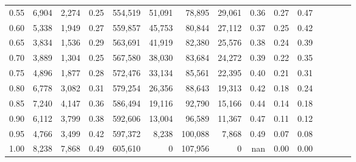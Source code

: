 \begin{tabular}{rrrcrrrrrrrrrrr}
0.55 &    6,904 &   2,274 &                                       0.25 &  554,519 &   51,091 &   78,895 &   29,061 &  0.36 &  0.27 &                         0.47 \\
0.60 &    5,338 &   1,949 &                                       0.27 &  559,857 &   45,753 &   80,844 &   27,112 &  0.37 &  0.25 &                         0.42 \\
0.65 &    3,834 &   1,536 &                                       0.29 &  563,691 &   41,919 &   82,380 &   25,576 &  0.38 &  0.24 &                         0.39 \\
0.70 &    3,889 &   1,304 &                                       0.25 &  567,580 &   38,030 &   83,684 &   24,272 &  0.39 &  0.22 &                         0.35 \\
0.75 &    4,896 &   1,877 &                                       0.28 &  572,476 &   33,134 &   85,561 &   22,395 &  0.40 &  0.21 &                         0.31 \\
0.80 &    6,778 &   3,082 &                                       0.31 &  579,254 &   26,356 &   88,643 &   19,313 &  0.42 &  0.18 &                         0.24 \\
0.85 &    7,240 &   4,147 &                                       0.36 &  586,494 &   19,116 &   92,790 &   15,166 &  0.44 &  0.14 &                         0.18 \\
0.90 &    6,112 &   3,799 &                                       0.38 &  592,606 &   13,004 &   96,589 &   11,367 &  0.47 &  0.11 &                         0.12 \\
0.95 &    4,766 &   3,499 &                                       0.42 &  597,372 &    8,238 &  100,088 &    7,868 &  0.49 &  0.07 &                         0.08 \\
1.00 &    8,238 &   7,868 &                                       0.49 &  605,610 &        0 &  107,956 &        0 &   nan &  0.00 &                         0.00 \\
\bottomrule
\end{tabular}
